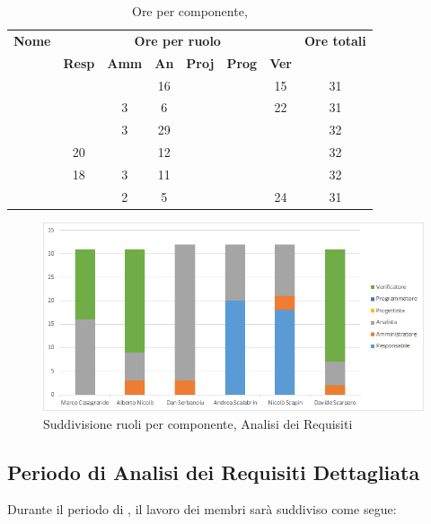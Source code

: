 \begin{table}[H]
	\begin{center}
		\begin{tabular}{|c|c|c|c|c|c|c|c|}
			\hline
			\textbf{Nome} & \multicolumn{6}{c|}{\textbf{Ore per ruolo}} & \textbf{Ore totali} \\\cline{2-7}
			& \textbf{Resp} & \textbf{Amm} & \textbf{An} & \textbf{Proj} & \textbf{Prog} & \textbf{Ver} & \\
			\hline
			\MC			&		&		&	16	&		&		&	15	&	31	\\
			\hline
			\AN			&		&	3	&	6	&	 	&		&	22	& 	31	\\
			\hline
			\DAN		&		&	3	&	29	&		&		&		&	32	\\
			\hline
			\AS			&	20	&	 	&	12 	&		&	 	& 		&	32	\\
			\hline
			\NS 		&	18	&	3	&	11	&		&		& 		&	32	\\
			\hline
			\DS			& 		&	2	&	5	&		&		&	24	&	31	\\
			\hline
		\end{tabular}
	\end{center}
	\caption{Ore per componente, \AdR}
\end{table}

\begin{figure}[H]
	\centering
	\includegraphics[scale=0.6]{img/6-1.png}
	\caption{Suddivisione ruoli per componente, Analisi dei Requisiti}
\end{figure}

\newpage
\subsection{Periodo di Analisi dei Requisiti Dettagliata}
Durante il periodo di \ARD, il lavoro dei membri sarà suddiviso come segue:

